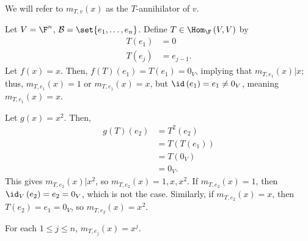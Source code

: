 \documentclass[10pt]{mypackage}
\begin{document}
We will refer to $m_{T,v}(x)$ as the $T$-annihilator of $v$.
\begin{example}
  Let $V = \F^n$, $\mathcal{B} = \set{e_1,\dots,e_n}$. Define $T\in \Hom_{\F}\left(V,V\right)$ by
  \begin{align*}
    T\left(e_1\right) &= 0\\
    T\left(e_{j}\right) &= e_{j-1} \tag*{$2\leq j\leq n$}.
  \end{align*}
  Let $f(x) = x$. Then, $f(T)\left(e_1\right) = T\left(e_1\right) = 0_V$, implying that $m_{T,e_1}\left(x\right) | x$; thus, $m_{T,e_1}(x) = 1$ or $m_{T,e_1}(x) = x$, but $\id\left(e_1\right) = e_1 \neq 0_V$, meaning $m_{T,e_1}\left(x\right) = x$.\newline

  Let $g(x) = x^2$. Then,
  \begin{align*}
    g(T)\left(e_2\right) &= T^{2}\left(e_2\right)\\
                         &= T\left(T\left(e_1\right)\right)\\
                         &= T\left(0_V\right)\\
                         &= 0_V.
  \end{align*}
  This gives $m_{T,e_2}(x) | x^2$, so $m_{T,e_2}(x) = 1,x,x^2$. If $m_{T,e_2}(x) = 1$, then $\id_V\left(e_2\right) = e_2 = 0_V$, which is not the case. Similarly, if $m_{T,e_2}(x) = x$, then $T(e_2) = e_1 = 0_V$, so $m_{T,e_2}(x) = x^2$.\newline

  For each $1 \leq j\leq n$, $m_{T,e_j}(x) = x^j$.
\end{example}
\end{document}
